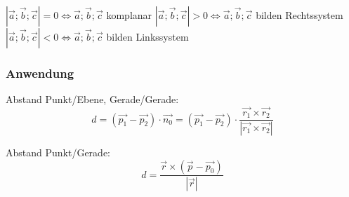 		$|\vec{a}; \vec{b}; \vec{c}| = 0 \Leftrightarrow \vec{a}; \vec{b}; \vec{c}$ komplanar \qquad 
		$|\vec{a}; \vec{b}; \vec{c}| > 0 \Leftrightarrow \vec{a}; \vec{b}; \vec{c}$ bilden Rechtssystem \qquad
		$|\vec{a}; \vec{b}; \vec{c}| < 0 \Leftrightarrow \vec{a}; \vec{b}; \vec{c}$ bilden Linkssystem

	\subsubsection{Anwendung}
		Abstand Punkt/Ebene, Gerade/Gerade:
		\begin{equation*}
			d = (\vec{p_1} - \vec{p_2}) \cdot \vec{n_0} = (\vec{p_1} - \vec{p_2}) \cdot \frac{\vec{r_1} \times \vec{r_2}}{|\vec{r_1} \times \vec{r_2}|}
		\end{equation*} 

		Abstand Punkt/Gerade:
		\begin{equation*}
			d = \frac{\vec{r} \times (\vec{p} - \vec{p_0})}{|\vec{r}|}
		\end{equation*}



























